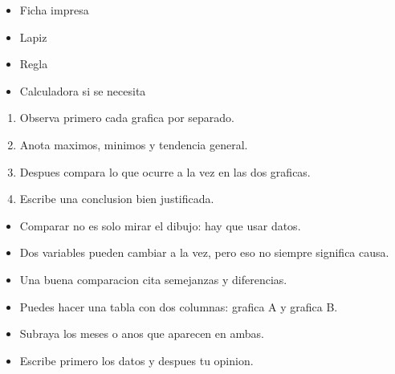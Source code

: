 \documentclass[12pt,a4paper]{article}
\begin{document}
        \FichaCabecera

        \begin{materialesbox}
        \begin{itemize}
    \item Ficha impresa
    \item Lapiz
    \item Regla
    \item Calculadora si se necesita
\end{itemize}
        \end{materialesbox}

        \begin{pasosbox}
        \begin{enumerate}
    \item Observa primero cada grafica por separado.
    \item Anota maximos, minimos y tendencia general.
    \item Despues compara lo que ocurre a la vez en las dos graficas.
    \item Escribe una conclusion bien justificada.
\end{enumerate}
        \end{pasosbox}

        \begin{recordatoriobox}
        \begin{itemize}
    \item Comparar no es solo mirar el dibujo: hay que usar datos.
    \item Dos variables pueden cambiar a la vez, pero eso no siempre significa causa.
    \item Una buena comparacion cita semejanzas y diferencias.
\end{itemize}
        \end{recordatoriobox}

        \begin{apoyobox}
        \begin{itemize}
    \item Puedes hacer una tabla con dos columnas: grafica A y grafica B.
    \item Subraya los meses o anos que aparecen en ambas.
    \item Escribe primero los datos y despues tu opinion.
\end{itemize}
        \end{apoyobox}

\end{document}
